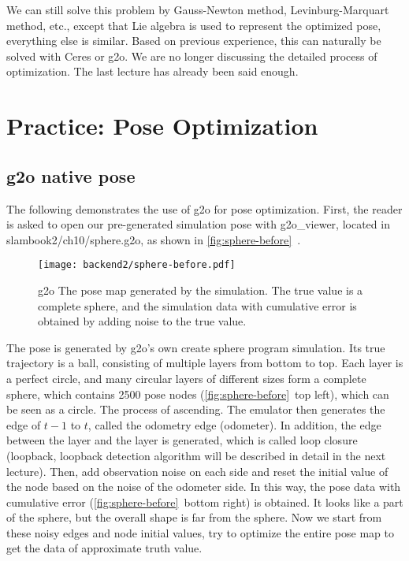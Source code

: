We can still solve this problem by Gauss-Newton method, Levinburg-Marquart method, etc., except that Lie algebra is used to represent the optimized pose, everything else is similar. Based on previous experience, this can naturally be solved with Ceres or g2o. We are no longer discussing the detailed process of optimization. The last lecture has already been said enough.

\section{Practice: Pose Optimization}
\subsection{g2o native pose}
The following demonstrates the use of g2o for pose optimization. First, the reader is asked to open our pre-generated simulation pose with g2o\_viewer, located in slambook2/ch10/sphere.g2o, as shown in \autoref{fig:sphere-before}~.

\begin{figure}[!htp]
\centering
\texttt{[image: backend2/sphere-before.pdf]}
\caption{g2o The pose map generated by the simulation. The true value is a complete sphere, and the simulation data with cumulative error is obtained by adding noise to the true value. }
\label{fig:sphere-before}
\end{figure}

The pose is generated by g2o's own create sphere program simulation. Its true trajectory is a ball, consisting of multiple layers from bottom to top. Each layer is a perfect circle, and many circular layers of different sizes form a complete sphere, which contains 2500 pose nodes (\autoref{fig:sphere-before}~top left), which can be seen as a circle. The process of ascending. The emulator then generates the edge of $t-1$ to $t$, called the odometry edge (odometer). In addition, the edge between the layer and the layer is generated, which is called loop closure (loopback, loopback detection algorithm will be described in detail in the next lecture). Then, add observation noise on each side and reset the initial value of the node based on the noise of the odometer side. In this way, the pose data with cumulative error (\autoref{fig:sphere-before}~bottom right) is obtained. It looks like a part of the sphere, but the overall shape is far from the sphere. Now we start from these noisy edges and node initial values, try to optimize the entire pose map to get the data of approximate truth value.

